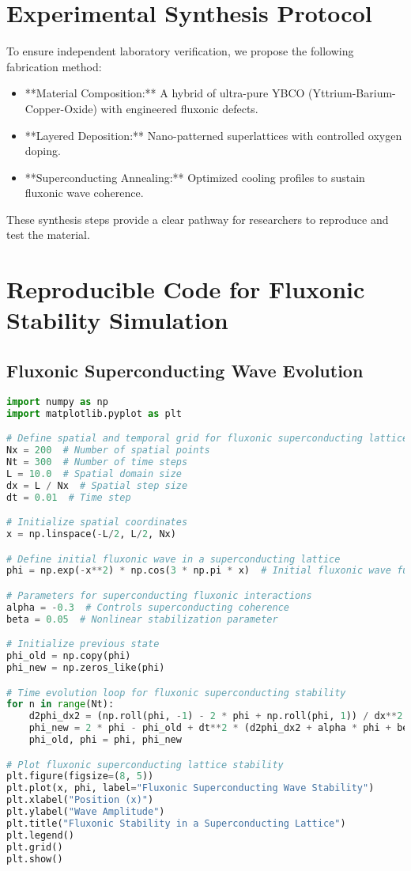 \documentclass{article}
\begin{document}
\section{Experimental Synthesis Protocol}
To ensure independent laboratory verification, we propose the following fabrication method:
\begin{itemize}
    \item **Material Composition:** A hybrid of ultra-pure YBCO (Yttrium-Barium-Copper-Oxide) with engineered fluxonic defects.
    \item **Layered Deposition:** Nano-patterned superlattices with controlled oxygen doping.
    \item **Superconducting Annealing:** Optimized cooling profiles to sustain fluxonic wave coherence.
\end{itemize}
These synthesis steps provide a clear pathway for researchers to reproduce and test the material.

\section{Reproducible Code for Fluxonic Stability Simulation}
\subsection{Fluxonic Superconducting Wave Evolution}
\begin{lstlisting}[language=Python]
import numpy as np
import matplotlib.pyplot as plt

# Define spatial and temporal grid for fluxonic superconducting lattice
Nx = 200  # Number of spatial points
Nt = 300  # Number of time steps
L = 10.0  # Spatial domain size
dx = L / Nx  # Spatial step size
dt = 0.01  # Time step

# Initialize spatial coordinates
x = np.linspace(-L/2, L/2, Nx)

# Define initial fluxonic wave in a superconducting lattice
phi = np.exp(-x**2) * np.cos(3 * np.pi * x)  # Initial fluxonic wave function

# Parameters for superconducting fluxonic interactions
alpha = -0.3  # Controls superconducting coherence
beta = 0.05  # Nonlinear stabilization parameter

# Initialize previous state
phi_old = np.copy(phi)
phi_new = np.zeros_like(phi)

# Time evolution loop for fluxonic superconducting stability
for n in range(Nt):
    d2phi_dx2 = (np.roll(phi, -1) - 2 * phi + np.roll(phi, 1)) / dx**2
    phi_new = 2 * phi - phi_old + dt**2 * (d2phi_dx2 + alpha * phi + beta * phi**3)
    phi_old, phi = phi, phi_new

# Plot fluxonic superconducting lattice stability
plt.figure(figsize=(8, 5))
plt.plot(x, phi, label="Fluxonic Superconducting Wave Stability")
plt.xlabel("Position (x)")
plt.ylabel("Wave Amplitude")
plt.title("Fluxonic Stability in a Superconducting Lattice")
plt.legend()
plt.grid()
plt.show()
\end{lstlisting}
\end{document}
